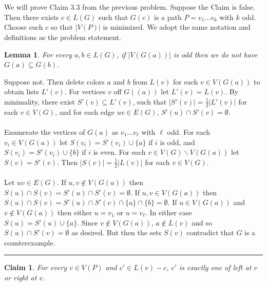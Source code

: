 \documentclass[letterpaper,12pt,oneside,onecolumn]{article}
\newenvironment{proof}{{\bf Proof:  }}{\hfill\rule{2mm}{2mm}}
\newtheorem{lemma}[fact]{Lemma}
\newtheorem{claim}[fact]{Claim}
\begin{document}
\newpage
\section{}
\paragraph{}
We will prove Claim $3.3$ from the previous problem. Suppose the Claim is false. Then there exists $c \in L(G)$  such that $G(c)$ is a path $P=v_1\dots v_k$ with $k$ odd. Choose such $c$ so that $|V(P)|$ is minimized. We adopt the same notation and definitions as the problem statement.
\begin{lemma}
	For every $a,b \in L(G)$, if $|V(G(a))|$ is odd then we do not have $G(a) \subseteq G(b)$.
\end{lemma}
\begin{proof}
	Suppose not. Then delete colors $a$ and $b$ from $L(v)$ for each $v \in V(G(a))$ to obtain lists $L'(v)$. For vertices $v$ off $G((a))$ let $L'(v) = L(v)$.  By minimality, there exist $S'(v) \subseteq L'(v)$, such that $|S'(v)| = \frac{1}{2}|L'(v)|$ for each $v \in V(G)$, and for each edge $uv \in E(G)$, $S'(u) \cap S'(v) = \emptyset$.
	\paragraph{}
	Enumerate the vertices of $G(a)$ as $v_1 \dots v_\ell$ with $\ell$ odd. For each $v_i \in V(G(a))$ let $S(v_i) = S'(v_i) \cup \{a\}$ if $i$ is odd, and $S(v_i) = S'(v_i) \cup \{b\}$ if $i$ is even. For each $v \in V(G)\backslash V(G(a))$ let $S(v) = S'(v)$. Then $|S(v)| = \frac{1}{2} |L(v)|$ for each $v \in V(G)$. 
	\paragraph{}
	Let $uv \in E(G)$. If $u,v \not\in V(G(a))$ then $S(u) \cap S(v) = S'(u) \cap S'(v) = \emptyset$. If $u,v \in V(G(a))$ then $S(u) \cap S(v) = S'(u) \cap S'(v) \cap \{a\} \cap \{b\} = \emptyset$. If $u \in V(G(a))$ and $v \not\in V(G(a))$ then either $u = v_1$ or $u = v_\ell$. In either case $S(u) = S'(u) \cup \{a\}$. Since $v \not\in V(G(a))$, $a \not\in L(v)$ and so $S(u) \cap S'(v) = \emptyset$ as desired. But then the sets $S(v)$ contradict that $G$ is a counterexample.
\end{proof}
\begin{claim}
	For every $v \in V(P)$ and $c' \in L(v) -c$, $c'$ is exactly one of left at $v$ or right at $v$.
\end{claim}
\end{document}
